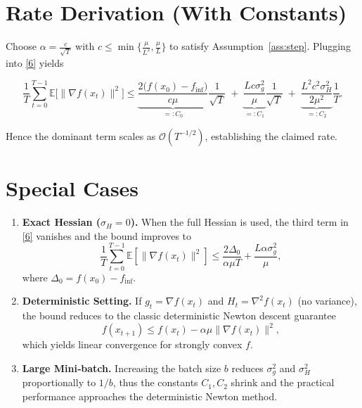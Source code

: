 \documentclass{article}
\newcommand{\E}{\mathbb{E}}
\begin{document}
\section*{Rate Derivation (With Constants)}
Choose $\alpha = \frac{c}{\sqrt{T}}$ with $c\le \min\{\frac{\mu}{L^{2}},\frac{\mu}{L}\}$ to satisfy Assumption~\ref{ass:step}.  
Plugging into \eqref{6} yields

\[
\frac{1}{T}\sum_{t=0}^{T-1}\E\!\big[\|\nabla f(x_t)\|^{2}\big]
\le
\underbrace{\frac{2\big(f(x_0)-f_{\inf}\big)}{c\mu}}_{=:C_{0}}\frac{1}{\sqrt{T}}
\;+\;
\underbrace{\frac{Lc\sigma_{g}^{2}}{\mu}}_{=:C_{1}}\frac{1}{\sqrt{T}}
\;+\;
\underbrace{\frac{L^{2}c^{2}\sigma_{H}^{2}}{2\mu^{2}}}_{=:C_{2}}\frac{1}{T}.
\]

Hence the dominant term scales as $\mathcal{O}(T^{-1/2})$, establishing the claimed rate.

\section*{Special Cases}
\begin{enumerate}
\item \textbf{Exact Hessian ($\sigma_{H}=0$).}  
When the full Hessian is used, the third term in \eqref{6} vanishes and the bound improves to
\[
\frac{1}{T}\sum_{t=0}^{T-1}\E[\|\nabla f(x_t)\|^{2}]
\le
\frac{2\Delta_{0}}{\alpha\mu T}
+\frac{L\alpha\sigma_{g}^{2}}{\mu},
\]
where $\Delta_{0}=f(x_0)-f_{\inf}$.
\item \textbf{Deterministic Setting.}  
If $g_t=\nabla f(x_t)$ and $H_t=\nabla^{2}f(x_t)$ (no variance), the bound reduces to the classic deterministic Newton descent guarantee
\[
f(x_{t+1})\le f(x_t)-\alpha\mu\|\nabla f(x_t)\|^{2},
\]
which yields linear convergence for strongly convex $f$.
\item \textbf{Large Mini‑batch.}  
Increasing the batch size $b$ reduces $\sigma_{g}^{2}$ and $\sigma_{H}^{2}$ proportionally to $1/b$, thus the constants $C_{1},C_{2}$ shrink and the practical performance approaches the deterministic Newton method.
\end{enumerate}
\end{document}
